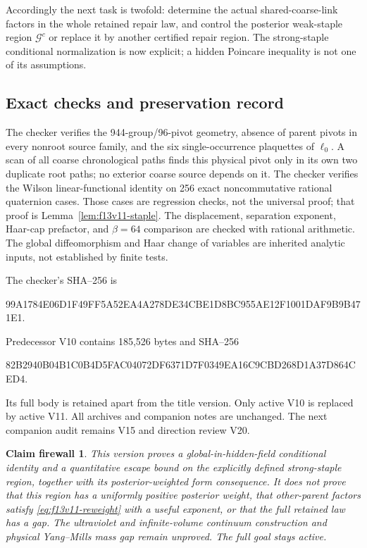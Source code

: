 \documentclass[11pt,oneside]{article}
\newtheorem{firewall}[theorem]{Claim firewall}
\begin{document}
Accordingly the next task is twofold: determine
the actual shared-coarse-link factors in the
whole retained repair law, and control the
posterior weak-staple region \(\mathcal G^c\)
or replace it by another certified repair region.
The strong-staple conditional normalization is
now explicit; a hidden Poincare inequality is
not one of its assumptions.

\subsection{Exact checks and preservation record}

The checker
verifies the 944-group/96-pivot geometry, absence
of parent pivots in every nonroot source family,
and the six single-occurrence plaquettes of
\(\ell_0\). A scan of all coarse chronological
paths finds this physical pivot only in its own
two duplicate root paths; no exterior coarse
source depends on it. The checker verifies the Wilson linear-functional
identity on 256 exact noncommutative rational
quaternion cases. Those cases are regression
checks, not the universal proof; that proof is
Lemma~\ref{lem:f13v11-staple}. The displacement,
separation exponent, Haar-cap prefactor, and
\(\beta=64\) comparison are checked with rational
arithmetic. The global diffeomorphism and Haar
change of variables are inherited analytic
inputs, not established by finite tests.

The checker's SHA--256 is
\begin{center}\scriptsize\ttfamily
99A1784E06D1F49FF5A52EA4A278DE34CBE1D8BC955AE12F1001DAF9B9B471E1.
\end{center}
Predecessor V10 contains 185,526 bytes and
SHA--256
\begin{center}\scriptsize\ttfamily
82B2940B04B1C0B4D5FAC04072DF6371D7F0349EA16C9CBD268D1A37D864CED4.
\end{center}
Its full body is retained apart from the title
version. Only active V10 is replaced by active
V11. All archives and companion notes are
unchanged. The next companion audit remains
V15 and direction review V20.

\begin{firewall}
This version proves a global-in-hidden-field
conditional identity and a quantitative escape
bound on the explicitly defined strong-staple
region, together with its posterior-weighted
form consequence. It does not prove that this
region has a uniformly positive posterior
weight, that other-parent factors satisfy
\eqref{eq:f13v11-reweight} with a useful exponent,
or that the full retained law has a gap.
The ultraviolet and infinite-volume continuum
construction and physical Yang--Mills mass gap
remain unproved. The full goal stays active.
\end{firewall}
\end{document}
